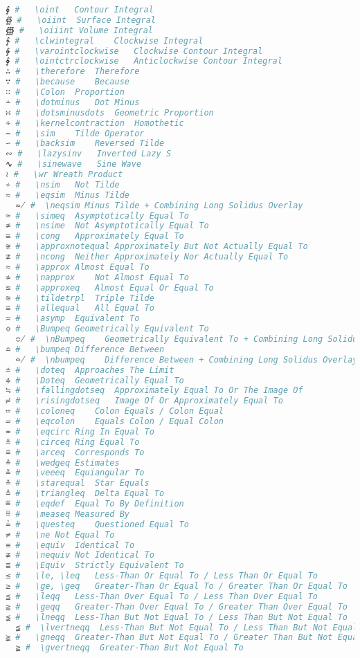 \begin{lstlisting}[language=Julia, linewidth=\textwidth]
∮ #   \oint   Contour Integral
∯ #   \oiint  Surface Integral
∰ #   \oiiint Volume Integral
∱ #   \clwintegral    Clockwise Integral
∲ #   \varointclockwise   Clockwise Contour Integral
∳ #   \ointctrclockwise   Anticlockwise Contour Integral
∴ #   \therefore  Therefore
∵ #   \because    Because
∷ #   \Colon  Proportion
∸ #   \dotminus   Dot Minus
∺ #   \dotsminusdots  Geometric Proportion
∻ #   \kernelcontraction  Homothetic
∼ #   \sim    Tilde Operator
∽ #   \backsim    Reversed Tilde
∾ #   \lazysinv   Inverted Lazy S
∿ #   \sinewave   Sine Wave
≀ #   \wr Wreath Product
≁ #   \nsim   Not Tilde
≂ #   \eqsim  Minus Tilde
  ≂̸ #  \neqsim Minus Tilde + Combining Long Solidus Overlay
≃ #   \simeq  Asymptotically Equal To
≄ #   \nsime  Not Asymptotically Equal To
≅ #   \cong   Approximately Equal To
≆ #   \approxnotequal Approximately But Not Actually Equal To
≇ #   \ncong  Neither Approximately Nor Actually Equal To
≈ #   \approx Almost Equal To
≉ #   \napprox    Not Almost Equal To
≊ #   \approxeq   Almost Equal Or Equal To
≋ #   \tildetrpl  Triple Tilde
≌ #   \allequal   All Equal To
≍ #   \asymp  Equivalent To
≎ #   \Bumpeq Geometrically Equivalent To
  ≎̸ #  \nBumpeq    Geometrically Equivalent To + Combining Long Solidus Overlay
≏ #   \bumpeq Difference Between
  ≏̸ #  \nbumpeq    Difference Between + Combining Long Solidus Overlay
≐ #   \doteq  Approaches The Limit
≑ #   \Doteq  Geometrically Equal To
≒ #   \fallingdotseq  Approximately Equal To Or The Image Of
≓ #   \risingdotseq   Image Of Or Approximately Equal To
≔ #   \coloneq    Colon Equals / Colon Equal
≕ #   \eqcolon    Equals Colon / Equal Colon
≖ #   \eqcirc Ring In Equal To
≗ #   \circeq Ring Equal To
≘ #   \arceq  Corresponds To
≙ #   \wedgeq Estimates
≚ #   \veeeq  Equiangular To
≛ #   \starequal  Star Equals
≜ #   \triangleq  Delta Equal To
≝ #   \eqdef  Equal To By Definition
≞ #   \measeq Measured By
≟ #   \questeq    Questioned Equal To
≠ #   \ne Not Equal To
≡ #   \equiv  Identical To
≢ #   \nequiv Not Identical To
≣ #   \Equiv  Strictly Equivalent To
≤ #   \le, \leq   Less-Than Or Equal To / Less Than Or Equal To
≥ #   \ge, \geq   Greater-Than Or Equal To / Greater Than Or Equal To
≦ #   \leqq   Less-Than Over Equal To / Less Than Over Equal To
≧ #   \geqq   Greater-Than Over Equal To / Greater Than Over Equal To
≨ #   \lneqq  Less-Than But Not Equal To / Less Than But Not Equal To
  ≨︀ #  \lvertneqq  Less-Than But Not Equal To / Less Than But Not Equal To + Variation Selector-1
≩ #   \gneqq  Greater-Than But Not Equal To / Greater Than But Not Equal To
  ≩︀ #  \gvertneqq  Greater-Than But Not Equal To

\end{lstlisting}
